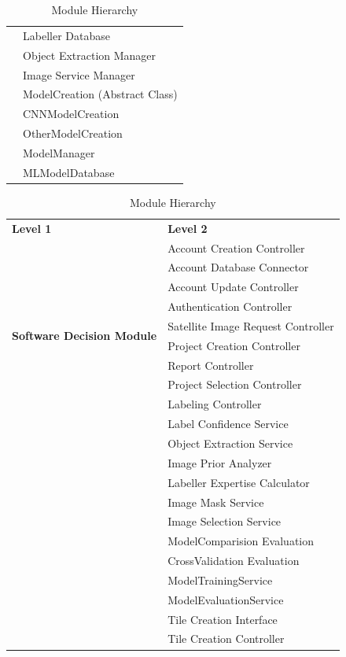 \documentclass[12pt, titlepage]{article}
\begin{document}
\begin{table}[h!]
\begin{tabular}{p{} p{}}
   & Labeller Database\\
   & Object Extraction Manager\\
   & Image Service Manager\\
   & ModelCreation (Abstract Class)\\
   & CNNModelCreation\\
   & OtherModelCreation\\
   & ModelManager\\
   & MLModelDatabase\\
  \midrule
\end{tabular}
\caption{Module Hierarchy}
\label{TblMH}
\end{table}
\begin{table}[h!]
  \centering
  \begin{tabular}{p{} p{}} 
  \toprule
  \textbf{Level 1} & \textbf{Level 2}\\
  \multirow{10}{0.3\textwidth}{\textbf{Software Decision Module}} 
   & Account Creation Controller\\
   & Account Database Connector\\
   & Account Update Controller\\
   & Authentication Controller\\
   & Satellite Image Request Controller\\
   & Project Creation Controller\\
   & Report Controller\\
   & Project Selection Controller\\
   & Labeling Controller\\
   & Label Confidence Service\\
   & Object Extraction Service\\
   & Image Prior Analyzer\\
   & Labeller Expertise Calculator\\
   & Image Mask Service\\
   & Image Selection Service\\
   & ModelComparision Evaluation\\
   & CrossValidation Evaluation\\
   & ModelTrainingService\\
   & ModelEvaluationService\\
   & Tile Creation Interface\\
   & Tile Creation Controller\\
  \bottomrule
  \end{tabular}
  \caption{Module Hierarchy}
  \label{TblMH}
  \end{table}
  
\end{document}
